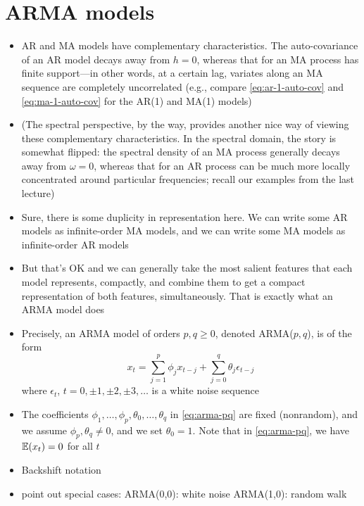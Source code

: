 \documentclass{article}
\begin{document}
\section{ARMA models}

\begin{itemize}
\item AR and MA models have complementary characteristics. The auto-covariance
  of an AR model decays away from $h=0$, whereas that for an MA process has
  finite support---in other words, at a certain lag, variates along an MA
  sequence are completely uncorrelated (e.g., compare \eqref{eq:ar-1-auto-cov}
  and \eqref{eq:ma-1-auto-cov} for the AR(1) and MA(1) models)   

\item (The spectral perspective, by the way, provides another nice way of
  viewing these complementary characteristics. In the spectral domain, the story
  is somewhat flipped: the spectral density of an MA process generally decays
  away from $\omega=0$, whereas that for an AR process can be much more locally
  concentrated around particular frequencies; recall our examples from the last
  lecture) 

\item Sure, there is some duplicity in representation here. We can write some AR
  models as infinite-order MA models, and we can write some MA models as
  infinite-order AR models 

\item But that's OK and we can generally take the most salient features that
  each model represents, compactly, and combine them to get a compact
  representation of both features, simultaneously. That is exactly what an
  ARMA model does

\item Precisely, an ARMA model of orders $p,q \geq 0$, denoted ARMA($p,q$), is
  of the form 
  \begin{equation}
    \label{eq:arma-pq}
  x_t = \sum_{j=1}^p \phi_j x_{t-j} + \sum_{j=0}^q \theta_j \epsilon_{t-j}  
  \end{equation}
  where $\epsilon_t$, $t = 0, \pm 1, \pm 2, \pm 3, \dots$ is a white noise
  sequence

\item The coefficients $\phi_1,\dots,\phi_p,\theta_0,\dots,\theta_q$ in
  \eqref{eq:arma-pq} are fixed (nonrandom), and we assume $\phi_p,\theta_q \not=
  0$, and we set $\theta_0 = 1$. Note that in \eqref{eq:arma-pq}, we have
  $\mathbb{E}(x_t) = 0$ for all $t$ 

\item Backshift notation

\item point out special cases: 
ARMA(0,0): white noise
ARMA(1,0): random walk 


\end{itemize}
\end{document}
